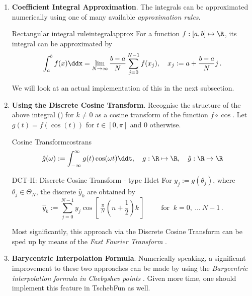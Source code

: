 \documentclass[12pt, a4paper]{article}
\newcommand{\tschebfun}{\textcolor{themecolor3}{TschebFun}\xspace}
\begin{document}
  \begin{enumerate}
    \item \textbf{Coefficient Integral Approximation}.
          The integrals can be approximated numerically using one of many available \textit{approximation rules}.
          \begin{theorem}{Rectangular integral rule}{integralapprox}
            For a function $f: [a, b] \mapsto \R$, its integral can be approximated by
            $$\int_a^b f(x) \ddx = \lim_{N \rightarrow \infty} \frac{b-a}{N} \sum_{j=0}^{N-1} f(x_j), \quad x_j := a + \frac{b-a}{N} j \,.$$
          \end{theorem}
          We will look at an actual implementation of this in the next subsection.

    \item \textbf{Using the Discrete Cosine Transform}.
          Recognise the structure of the above integral () for $k \neq 0$ as a cosine transform of the function $f \circ \cos$. Let $g(t) = f(\cos(t))$ for $t \in [0, \pi]$ and $0$ otherwise.

          \begin{definition}{Cosine Transform}{costrans}
            $$\hat{g}(\omega) := \int_{-\infty}^{\infty} g(t) \cos(\omega t) \ddt, \quad g: \R \mapsto \R, \quad \hat{g}: \R \mapsto \R$$
          \end{definition}
          \vspace*{-0.5cm}
          \begin{definition}{DCT-II: Discrete Cosine Transform - type II}{dct}
            For $y_j := g(\theta_j)$, where $\theta_j \in \Theta_N$, the discrete $\hat{y}_k$ are obtained by
            $$\hat{y}_k := \sum_{j=0}^{N-1}y_{j}\cos \left[\,{\tfrac {\,\pi \,}{N}}\left(n+{\frac {1}{2}}\right)k\,\right]\qquad {\text{ for }}~k=0,\ \dots \ N-1\,.$$
          \end{definition}

          Most significantly, this approach via the Discrete Cosine Transform can be sped up by means of the \emph{Fast Fourier Transform} \parencite{cooley-tukey-fft}.

    \item \textbf{Barycentric Interpolation Formula}.
          Numerically speaking, a significant improvement to these two approaches can be made by using the \emph{Barycentric interpolation formula in Chebyshev points} \parencite{atap}. Given more time, one should implement this feature in \tschebfun as well.
  \end{enumerate}
\end{document}
